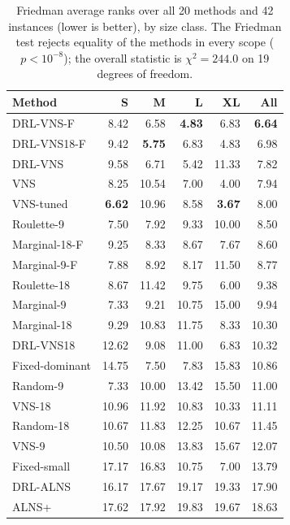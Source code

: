 \begin{table}[tb]
\centering
\caption{Friedman average ranks over all 20 methods and 42 instances (lower is better), by size class. The Friedman test rejects equality of the methods in every scope ($p<10^{-8}$); the overall statistic is $\chi^2=244.0$ on 19 degrees of freedom.}
\label{tab:ranks}
\small
\begin{tabular}{@{}lrrrrr@{}}
\toprule
Method & S & M & L & XL & All \\
\midrule
DRL-VNS-F & 8.42 & 6.58 & \textbf{4.83} & 6.83 & \textbf{6.64} \\
DRL-VNS18-F & 9.42 & \textbf{5.75} & 6.83 & 4.83 & 6.98 \\
DRL-VNS & 9.58 & 6.71 & 5.42 & 11.33 & 7.82 \\
VNS & 8.25 & 10.54 & 7.00 & 4.00 & 7.94 \\
VNS-tuned & \textbf{6.62} & 10.96 & 8.58 & \textbf{3.67} & 8.00 \\
Roulette-9 & 7.50 & 7.92 & 9.33 & 10.00 & 8.50 \\
Marginal-18-F & 9.25 & 8.33 & 8.67 & 7.67 & 8.60 \\
Marginal-9-F & 7.88 & 8.92 & 8.17 & 11.50 & 8.77 \\
Roulette-18 & 8.67 & 11.42 & 9.75 & 6.00 & 9.38 \\
Marginal-9 & 7.33 & 9.21 & 10.75 & 15.00 & 9.94 \\
Marginal-18 & 9.29 & 10.83 & 11.75 & 8.33 & 10.30 \\
DRL-VNS18 & 12.62 & 9.08 & 11.00 & 6.83 & 10.32 \\
Fixed-dominant & 14.75 & 7.50 & 7.83 & 15.83 & 10.86 \\
Random-9 & 7.33 & 10.00 & 13.42 & 15.50 & 11.00 \\
VNS-18 & 10.96 & 11.92 & 10.83 & 10.33 & 11.11 \\
Random-18 & 10.67 & 11.83 & 12.25 & 10.67 & 11.45 \\
VNS-9 & 10.50 & 10.08 & 13.83 & 15.67 & 12.07 \\
Fixed-small & 17.17 & 16.83 & 10.75 & 7.00 & 13.79 \\
DRL-ALNS & 16.17 & 17.67 & 19.17 & 19.33 & 17.90 \\
ALNS+ & 17.62 & 17.92 & 19.83 & 19.67 & 18.63 \\
\bottomrule
\end{tabular}
\end{table}
